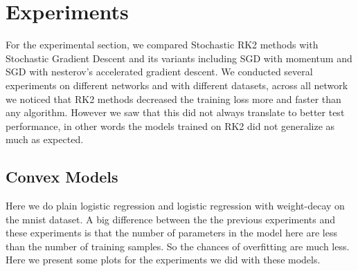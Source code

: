 
\section{Experiments}
For the experimental section, we compared Stochastic RK2 methods
with Stochastic Gradient Descent and its variants including SGD
with momentum and SGD with nesterov's accelerated gradient
descent. We conducted several experiments on different networks
and with different datasets, across all network we noticed that
RK2 methods decreased the training loss more and faster than any
algorithm. However we saw that this did not always translate to
better test performance, in other words the models trained on
RK2 did not generalize as much as expected.

\subsection{Convex Models}

Here we do plain logistic regression and logistic regression
with weight-decay on the mnist dataset. A big difference between
the the previous experiments and these experiments is that the
number of parameters in the model here are less than the number
of training samples. So the chances of overfitting are much
less. Here we present some plots for the experiments we did with
these models.

